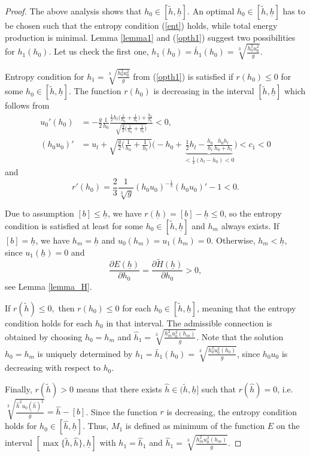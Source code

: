 \documentclass{article}
\theoremstyle{plain}
\theoremstyle{definition}
\theoremstyle{remark}
\begin{document}
\begin{proof}
The above analysis shows that  $h_0\in[\tilde{h},\underline{h}].$ An optimal
$h_0\in[\tilde{h},\underline{h}]$ has to be chosen such that the entropy condition (\ref{ent}) holds, 
while total energy production is minimal.  
Lemma \ref{lemma1} and (\ref{opth1}) suggest two possibilities for $h_1(h_0)$. 
Let us check the first one, $h_1(h_0)=\bar{h}_1(h_0)=\sqrt[3]{\frac{h_0^2u_0^2}{g}}$.


Entropy condition for  $h_1=\sqrt[3]{\frac{h_0^2u_0^2}{g}}$ from (\ref{opth1}) 
is satisfied if $r(h_0)\leq 0$ for some $h_0\in[\tilde{h},\underline{h}]$.
The function $r(h_0)$ is decreasing in the interval $[\tilde{h},\underline{h}]$ which follows from
\[\begin{split}
u_0'(h_0)&=-\frac{g}{2}\frac{1}{h_0}\frac{\frac{1}{2}h_l
\big(\frac{1}{h_0}+\frac{1}{h_l}\big)+\frac{h_0}{h_l}}{\sqrt{\frac{g}{2}
\big(\frac{1}{h_0}+\frac{1}{h_l}\big)}}<0,\\
(h_0u_0)'&=u_l+\sqrt{\frac{g}{2}\Big(\frac{1}{h_0}+\frac{1}{h_l}\Big)}
\Big(-h_0+\underbrace{\frac{1}{2}h_l-\frac{h_0}{h_l}
\frac{h_0h_l}{h_0+h_l}}_{<\frac{1}{2}(h_l-h_0)<0}\Big)<c_1<0
\end{split}\]
and 
\[r'(h_0)=\frac{2}{3}\frac{1}{\sqrt[3]{g}}(h_0u_0)^{-\frac{1}{3}}(h_0u_0)'-1<0.\]

Due to assumption $[b]\leq \underline{h}$, we have $r(\underline{h})=[b]-\underline{h}\leq 0$,
so the entropy condition is satisfied at least for some $h_0\in[\tilde{h},\underline{h}]$
and $h_m$ always exists. If $[b]=\underline{h}$, we have $h_m=\underline{h}$
and $u_0(h_m)=u_1(h_m)=0.$ Otherwise, $h_m<\underline{h}$, since $u_1(\underline{h})=0$ and 
\[\frac{\partial E(\underline{h})}{\partial h_0}
=\frac{\partial \tilde{H}(\underline{h})}{\partial h_0}>0,\]
see Lemma \ref{lemma_H}.

If  $r(\tilde{h})\leq 0,$ then $r(h_0)\leq 0$ for each $h_0\in[\tilde{h},\underline{h}]$, 
meaning that the entropy condition holds for each $h_0$ in that interval.
The admissible connection is obtained by choosing $h_0=h_m$ and 
$\hat{h}_1=\sqrt[3]{\frac{h_m^2u_0^2(h_m)}{g}}$. 
Note that the solution $h_0=h_m$ is uniquely determined by
$h_1=\bar{h}_1(h_0)=\sqrt[3]{\frac{h_0^2u_0^2(h_0)}{g}}$,
since $h_0u_0$ is decreasing with respect to $h_0$.

Finally, $r(\tilde{h})>0$ means that there exists $\hat{h}\in(\tilde{h},\underline{h}]$ such that
$r(\hat{h})=0$, i.e.  $\sqrt[3]{\frac{\hat{h}^2u_0(\hat{h})^2}{g}}=\hat{h}-[b]$.
Since the function $r$ is decreasing, the entropy condition holds
for $h_0\in[\hat{h},\underline{h}]$. 
\noindent
Thus, $M_1$ is defined as minimum of the function $E$ on the interval
$[\max\{\tilde{h},\hat{h}\},\underline{h}]$ with $h_1=\hat{h}_1$
and $\hat{h}_1=\sqrt[3]{\frac{h_m^2u_0^2(h_m)}{g}}$.


\end{proof}
\end{document}
